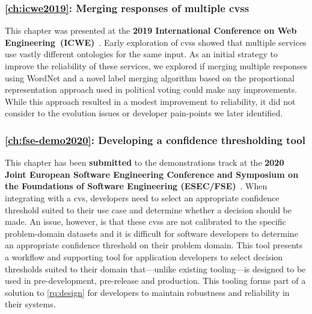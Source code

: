 \subsubsection{\cref{ch:icwe2019}: Merging responses of multiple \glspl{cvs}} This chapter was presented at the \textbf{2019 International Conference on Web Engineering~(ICWE)}~\citep{Ohtake:2019vi}. Early exploration of \glspl{cvs} showed that multiple services use vastly different ontologies for the same input. As an initial strategy to improve the reliability of these services, we explored if merging multiple responses using WordNet \citep{WordNetMiller1995} and a novel label merging algorithm based on the proportional representation approach used in political voting could make any improvements. While this approach resulted in a modest improvement to reliability, it did not consider to the evolution issues or developer pain-points we later identified.

\subsubsection{\cref{ch:fse-demo2020}: Developing a confidence thresholding tool} This chapter has been \textbf{submitted} to the demonstrations track at the \textbf{2020 Joint European Software Engineering Conference and Symposium on the Foundations of Software Engineering (ESEC/FSE)}~\citep{Cummaudo:2020fse-demo}. When integrating with a \gls{cvs}, developers need to select an appropriate confidence threshold suited to their use case and determine whether a decision should be made. An issue, however, is that these \glspl{cvs} are not calibrated to the specific problem-domain datasets and it is difficult for software developers to determine an appropriate confidence threshold on their problem domain. This tool presents a workflow and supporting tool for application developers to select decision thresholds suited to their domain that---unlike existing tooling---is designed to be used in pre-development, pre-release and production. This tooling forms part of a solution to \ref{rq:design} for developers to maintain robustness and reliability in their systems.

